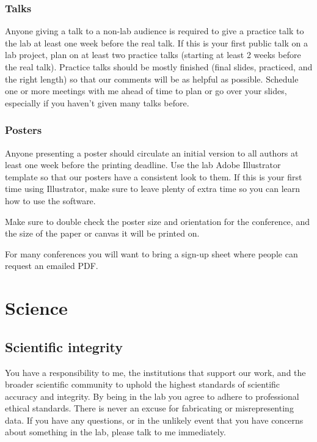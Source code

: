 \documentclass[letterpaper,12pt,oneside]{memoir}
\begin{document}
\subsection{Talks}
Anyone giving a talk to a non-lab audience is required to give a practice talk to the lab at least one week before the real talk. If this is your first public talk on a lab project, plan on at least two practice talks (starting at least 2 weeks before the real talk). Practice talks should be mostly finished (final slides, practiced, and the right length) so that our comments will be as helpful as possible. Schedule one or more meetings with me ahead of time to plan or go over your slides, especially if you haven't given many talks before.

\subsection{Posters}
Anyone presenting a poster should circulate an initial version to all authors at least one week before the printing deadline. Use the lab Adobe Illustrator template so that our posters have a consistent look to them. If this is your first time using Illustrator, make sure to leave plenty of extra time so you can learn how to use the software.

Make sure to double check the poster size and orientation for the conference, and the size of the paper or canvas it will be printed on.

For many conferences you will want to bring a sign-up sheet where people can request an emailed PDF.



\chapter{Science}

\section{Scientific integrity}

You have a responsibility to me, the institutions that support our work, and the broader scientific community to uphold the highest standards of scientific accuracy and integrity. By being in the lab you agree to adhere to professional ethical standards. There is never an excuse for fabricating or misrepresenting data. If you have any questions, or in the unlikely event that you have concerns about something in the lab, please talk to me immediately.
\end{document}
